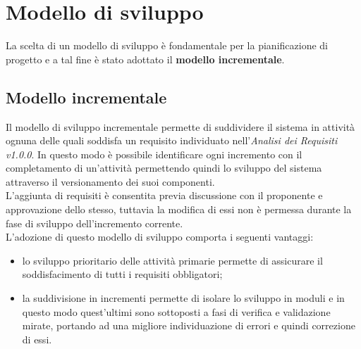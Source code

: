 \section{Modello di sviluppo}
La scelta di un modello di sviluppo è fondamentale per la pianificazione di 
progetto e a tal fine è stato adottato il \textbf{modello incrementale}.

\subsection{Modello incrementale}
Il modello di sviluppo incrementale permette di suddividere il sistema in 
attività ognuna delle quali soddisfa un requisito
individuato nell'\textit{Analisi dei Requisiti v1.0.0}. In questo modo è possibile 
identificare ogni incremento con il completamento di un'attività permettendo 
quindi lo sviluppo del sistema attraverso il versionamento dei suoi componenti. 
\\
L'aggiunta di requisiti è consentita previa discussione con il proponente e 
approvazione dello stesso, tuttavia la modifica di essi non è permessa 
durante la fase di sviluppo dell'incremento corrente.\\
L'adozione di questo modello di sviluppo comporta i seguenti vantaggi:
\begin{itemize}
	\item lo sviluppo prioritario delle attività primarie permette di 
	assicurare il soddisfacimento di tutti i requisiti obbligatori;
	\item la suddivisione in incrementi permette di isolare lo sviluppo in 
	moduli e in questo modo quest'ultimi sono sottoposti a fasi di verifica e 
	validazione mirate, portando ad una migliore individuazione di errori e 
	quindi correzione di essi.
\end{itemize}

